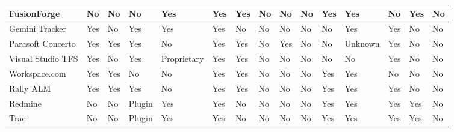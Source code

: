 \begin{landscape}
\begin{table}[!ht]
\begin{center}
\begin{tabular}{|l|l|l|l|l|l|l|l|l|l|l|l|l|l|l|}
    FusionForge               & No              & No           & No             & Yes                         & Yes            & Yes     & No             & No           & No                      & Yes                         & Yes       & No                 & Yes         & No           \\ \hline
    Gemini Tracker            & Yes             & No           & Yes            & Yes                         & Yes            & No      & No             & No           & No                      & No                          & Yes       & Yes                & No          & No           \\ \hline
    Parasoft Concerto         & Yes             & Yes          & Yes            & No                          & Yes            & Yes     & No             & Yes          & No                      & No                          & Unknown   & Yes                & No          & No           \\ \hline
    Visual Studio TFS         & Yes             & No           & Yes            & Proprietary                 & Yes            & Yes     & No             & No           & No                      & No                          & No        & Yes                & No          & No           \\ \hline
    Workspace.com             & Yes             & Yes          & No             & No                          & Yes            & Yes     & No             & No           & No                      & Yes                         & Yes       & No                 & No          & No           \\ \hline
    Rally ALM                 & Yes             & Yes          & Yes            & No                          & Yes            & Yes     & No             & No           & No                      & Yes                         & Yes       & Yes                & No          & No           \\ \hline
    Redmine                   & No              & No           & Plugin         & Yes                         & Yes            & No      & No             & No           & No                      & Yes                         & Yes       & Yes                & Yes         & No           \\ \hline
    Trac                      & No              & No           & Plugin         & Yes                         & Yes            & No      & No             & No           & No                      & Yes                         & Yes       & Yes                & Yes         & No           \\ \hline

\end{tabular}
\end{center}
\end{table}
\end{landscape}
